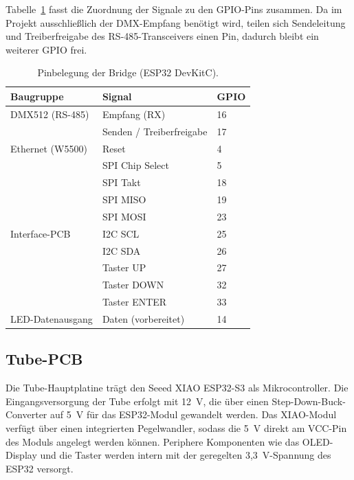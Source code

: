 Tabelle~\ref{tab:pinbelegung-bridge} fasst die Zuordnung der Signale zu
den GPIO-Pins zusammen. Da im Projekt ausschließlich der DMX-Empfang
benötigt wird, teilen sich Sendeleitung und Treiberfreigabe des
RS-485-Transceivers einen Pin, dadurch bleibt ein weiterer GPIO frei.

\begin{table}[H]
    \centering
    \small
    \begin{tabular}{lll}
        \toprule
        Baugruppe & Signal & GPIO \\
        \midrule
        DMX512 (RS-485)      & Empfang (RX)              & 16 \\
                             & Senden / Treiberfreigabe  & 17 \\
        Ethernet (W5500)     & Reset                     & 4  \\
                             & SPI Chip Select           & 5  \\
                             & SPI Takt                  & 18 \\
                             & SPI MISO                  & 19 \\
                             & SPI MOSI                  & 23 \\
        Interface-PCB        & I2C SCL                   & 25 \\
                             & I2C SDA                   & 26 \\
                             & Taster UP                 & 27 \\
                             & Taster DOWN               & 32 \\
                             & Taster ENTER              & 33 \\
        LED-Datenausgang     & Daten (vorbereitet)       & 14 \\
        \bottomrule
    \end{tabular}
    \caption{Pinbelegung der Bridge (ESP32 DevKitC).}
    \label{tab:pinbelegung-bridge}
\end{table}


\subsection{Tube-PCB}
\label{subsec:tube-mainboard}

Die Tube-Hauptplatine trägt den Seeed XIAO ESP32-S3 als
Mikrocontroller. Die Eingangsversorgung der Tube erfolgt mit
12~V, die über einen Step-Down-Buck-Converter auf 5~V für das
ESP32-Modul gewandelt werden. Das XIAO-Modul verfügt über
einen integrierten Pegelwandler, sodass die 5~V direkt am
VCC-Pin des Moduls angelegt werden können. Periphere
Komponenten wie das OLED-Display und die Taster werden intern
mit der geregelten 3,3~V-Spannung des ESP32 versorgt.

